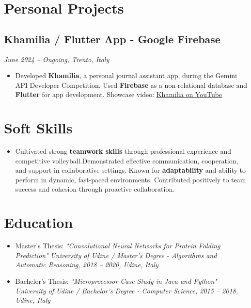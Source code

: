 \documentclass[a4paper,10pt]{article}
\begin{document}
\section*{Personal Projects}
\subsection*{Khamilia / Flutter App - Google Firebase}
\textit{June 2024 -- Ongoing, Trento, Italy}
\begin{itemize}[leftmargin=1.2em]
    \item Developed \textbf{Khamilia}, a personal journal assistant app, during the Gemini API Developer Competition. Used \textbf{Firebase} as a non-relational database and \textbf{Flutter} for app development. Showcase video: \href{https://www.youtube.com/watch?v=viXL9V_b6mo&ab_channel=pierodigia}{Khamilia on YouTube}
\end{itemize}

\section*{Soft Skills}
\begin{itemize}[leftmargin=1.2em]
    \item Cultivated strong \textbf{teamwork skills} through professional experience and competitive volleyball.Demonstrated effective communication, cooperation, and support in collaborative settings. Known for \textbf{adaptability} and ability to perform in dynamic, fast-paced environments. Contributed positively to team success and cohesion through proactive collaboration.
\end{itemize}

\section*{Education}
\begin{itemize}[leftmargin=1.2em]
    \item Master’s Thesis: \textit{"Convolutional Neural Networks for Protein Folding Prediction"}
    \textit{University of Udine / Master’s Degree - Algorithms and Automatic Reasoning, 2018 -- 2020, Udine, Italy}
\end{itemize}
\begin{itemize}[leftmargin=1.2em]
    \item Bachelor’s Thesis: \textit{"Microprocessor Case Study in Java and Python"} \textit{
    University of Udine / Bachelor’s Degree - Computer Science, 2015 -- 2018, Udine, Italy}
\end{itemize}
\end{document}
